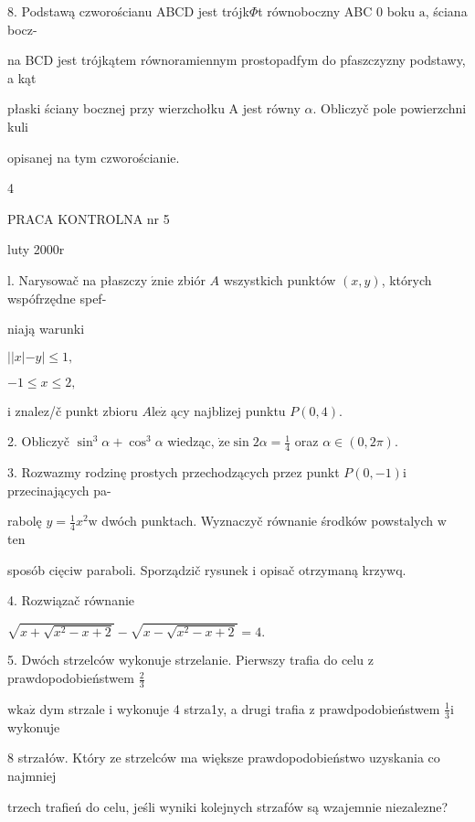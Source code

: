 \documentclass[a4paper,12pt]{article}
\begin{document}
8. Podstawą czworościanu ABCD jest trójk$\Phi$t równoboczny ABC $0$ boku $\mathrm{a}$, ściana bocz-

na BCD jest trójkątem równoramiennym prostopadfym do pfaszczyzny podstawy, a kąt

płaski ściany bocznej przy wierzchołku A jest równy $\alpha$. Obliczyč pole powierzchni kuli

opisanej na tym czworościanie.

4





PRACA KONTROLNA nr 5

luty 2000r

l. Narysowač na płaszczy $\acute{\mathrm{z}}\mathrm{n}\mathrm{i}\mathrm{e}$ zbiór $A$ wszystkich punktów $(x,y)$, których wspófrzędne spef-

niają warunki

$||x| -y| \leq 1,$

$-1\leq x\leq 2,$

$\mathrm{i}$ znalez/č punkt zbioru $A\mathrm{l}\mathrm{e}\dot{\mathrm{z}}$ ący najblizej punktu $P(0,4).$

2. Obliczyč $\sin^{3}\alpha+\cos^{3}\alpha$ wiedząc, $\displaystyle \dot{\mathrm{z}}\mathrm{e}\sin 2\alpha=\frac{1}{4}$ oraz $\alpha\in (0,2\pi).$

3. Rozwazmy rodzinę prostych przechodzących przez punkt $P(0,-1) \mathrm{i}$ przecinających pa-

rabolę $y = \displaystyle \frac{1}{4}x^{2} \mathrm{w}$ dwóch punktach. Wyznaczyč równanie środków powstalych $\mathrm{w}$ ten

sposób cięciw paraboli. Sporządzič rysunek $\mathrm{i}$ opisač otrzymaną krzywq.

4. Rozwiązač równanie

$\sqrt{x+\sqrt{x^{2}-x+2}}-\sqrt{x-\sqrt{x^{2}-x+2}}=4.$

5. Dwóch strzelców wykonuje strzelanie. Pierwszy trafia do celu $\mathrm{z}$ prawdopodobieństwem $\displaystyle \frac{2}{3}$

$\mathrm{w}\mathrm{k}\mathrm{a}\dot{\mathrm{z}}$ dym strzale $\mathrm{i}$ wykonuje 4 strza1y, a drugi trafia $\mathrm{z}$ prawdpodobieństwem $\displaystyle \frac{1}{3}\mathrm{i}$ wykonuje

8 strzałów. Który ze strzelców ma większe prawdopodobieństwo uzyskania co najmniej

trzech trafień do celu, jeśli wyniki kolejnych strzafów są wzajemnie niezalezne?
\end{document}
